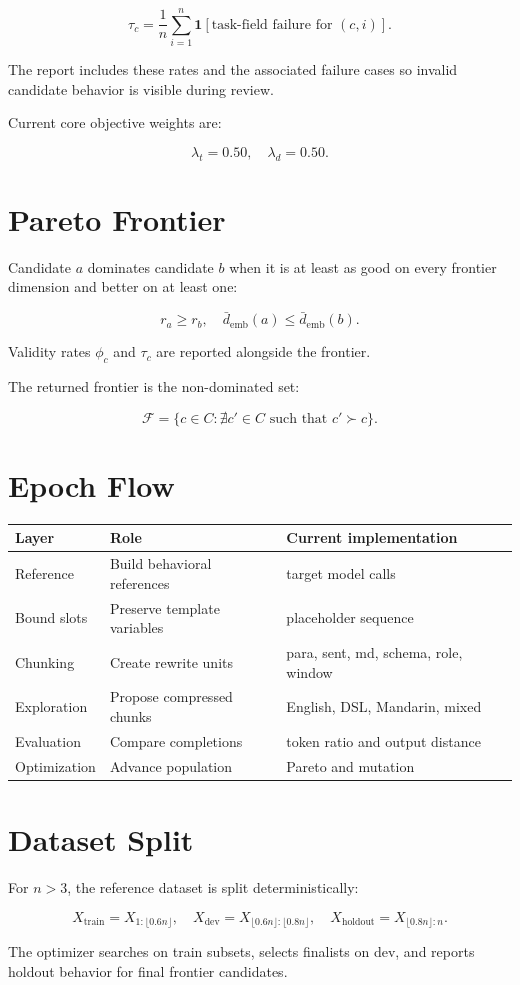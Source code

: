 \documentclass[11pt]{article}
\begin{document}
\[
\tau_c =
\frac{1}{n}\sum_{i=1}^{n}\mathbf{1}[\text{task-field failure for }(c,i)].
\]

The report includes these rates and the associated failure cases so invalid
candidate behavior is visible during review.

Current core objective weights are:

\[
\lambda_t = 0.50,\quad
\lambda_d = 0.50.
\]

\section{Pareto Frontier}

Candidate \(a\) dominates candidate \(b\) when it is at least as good on every
frontier dimension and better on at least one:

\[
r_a \ge r_b,\quad
\bar{d}_{\mathrm{emb}}(a) \le \bar{d}_{\mathrm{emb}}(b).
\]

Validity rates \(\phi_c\) and \(\tau_c\) are reported alongside the frontier.

The returned frontier is the non-dominated set:

\[
\mathcal{F} =
\{c \in C : \nexists c' \in C \text{ such that } c' \succ c\}.
\]

\section{Epoch Flow}

\begin{center}
\begin{tabular}{lll}
\toprule
Layer & Role & Current implementation \\
\midrule
Reference & Build behavioral references & target model calls \\
Bound slots & Preserve template variables & placeholder sequence \\
Chunking & Create rewrite units & para, sent, md, schema, role, window \\
Exploration & Propose compressed chunks & English, DSL, Mandarin, mixed \\
Evaluation & Compare completions & token ratio and output distance \\
Optimization & Advance population & Pareto and mutation \\
\bottomrule
\end{tabular}
\end{center}

\section{Dataset Split}

For \(n > 3\), the reference dataset is split deterministically:

\[
X_{\mathrm{train}} = X_{1:\lfloor 0.6n \rfloor},
\quad
X_{\mathrm{dev}} = X_{\lfloor 0.6n \rfloor:\lfloor 0.8n \rfloor},
\quad
X_{\mathrm{holdout}} = X_{\lfloor 0.8n \rfloor:n}.
\]

The optimizer searches on train subsets, selects finalists on dev, and reports
holdout behavior for final frontier candidates.
\end{document}
